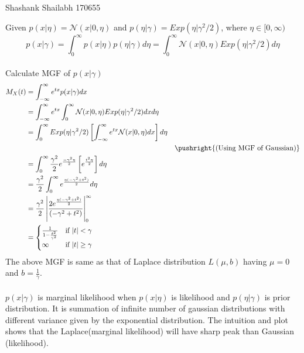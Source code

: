 \documentclass[a4paper,11pt]{article}
\begin{document}
{Shashank Shailabh}   %
{170655}	%

\begin{pmisolution}
Given \hspace{2em} \(p(x|\eta) = \mathcal{N}(x|0,\eta)\) \hspace{2em} and \hspace{2em} \(p(\eta|\gamma) = Exp(\eta|\gamma^{2}/2 )\), where \(\eta \in [0,\infty)\)
\\
\[p(x|\gamma) = \int_{0}^{\infty} p(x|\eta)p(\eta|\gamma)d\eta = \int_{0}^{\infty} \mathcal{N}(x|0,\eta)Exp(\eta|\gamma^{2}/2 )d\eta\]\\
 Calculate MGF of \(p(x|\gamma)\)\\
 \begin{align*}
     M_{X}(t) &= \int_{-\infty}^{\infty} e^{tx}p(x|\gamma)dx\\
     &= \int_{-\infty}^{\infty}e^{tx} \int_{0}^{\infty} \mathcal{N}(x|0,\eta)Exp(\eta|\gamma^{2}/2 )dx d\eta\\
    &= \int_{0}^{\infty}Exp(\eta|\gamma^{2}/2)\left[\int_{-\infty}^{\infty}e^{tx}\mathcal{N}(x|0,\eta) dx\right]d\eta\\
    & &\pushright{\text{(Using MGF of Gaussian)}}\\
    &= \int_{0}^{\infty}\frac{\gamma^{2}}{2}e^{\frac{-\gamma^{2}\eta}{2}}\left[e^{\frac{t^{2}\eta}{2}}\right]d\eta\\
    &= \frac{\gamma^{2}}{2} \int_{0}^{\infty} e^{\frac{\eta(-\gamma^{2} + t^{2})}{2}}d\eta\\
    &= \frac{\gamma^{2}}{2} \left|\frac{2e^{\frac{\eta(-\gamma^{2} + t^{2})}{2}}}{(-\gamma^{2} + t^{2})} \right|_{0}^{\infty}\\
    &=  \begin{cases}
    \frac{1}{1- \frac{t^{2}}{\gamma^2}} &  \text{if   }    |t| < \gamma\\
    \infty &  \text{if   }  |t| \geq \gamma
  \end{cases}
 \end{align*}
 The above MGF is same as that of Laplace distribution \( L(\mu,b)\) having \(\mu = 0\) and \(b = \frac{1}{\gamma}\).\\\\
$p(x|\gamma)$ is marginal likelihood when $p(x|\eta)$ is likelihood and $p(\eta|\gamma)$ is prior distribution. It is summation of infinite number of gaussian distributions with different variance given by the exponential distribution. The intuition and plot shows that the Laplace(marginal likelihood) will have sharp peak than Gaussian (likelihood).

\end{pmisolution}
\end{document}

